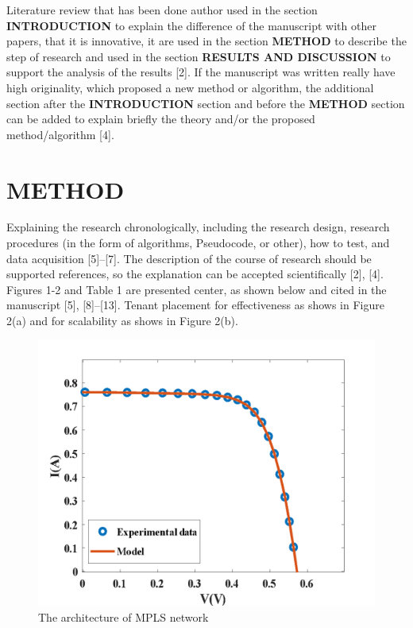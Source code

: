 \documentclass{iaesarticle}
\begin{document}
Literature review that has been done author used in the section \textbf{INTRODUCTION} to explain 
the difference of the manuscript with other papers, that it is innovative, it are used in the section \textbf{METHOD} to describe the step of research and used in the section \textbf{RESULTS AND DISCUSSION} to support the analysis of the results [2]. If the manuscript was written really have high originality, which proposed a new method or algorithm, the additional section after the \textbf{INTRODUCTION} section and before the \textbf{METHOD} section can be added to explain briefly the theory and/or the proposed method/algorithm [4].


\section{METHOD}
\label{}
Explaining the research chronologically, including the research design, research procedures (in the form of algorithms, Pseudocode, or other), how to test, and data acquisition [5]–[7]. The description of the course of research should be supported references, so the explanation can be accepted scientifically [2], [4]. Figures 1-2 and Table 1 are presented center, as shown below and cited in the manuscript [5], [8]–[13]. Tenant placement for effectiveness as shows in Figure 2(a) and for scalability as shows in Figure 2(b).

\begin{figure}[H]
\centering
\includegraphics[scale=0.26 ]{Figure1}
\vspace{.7em}
\caption{The architecture of MPLS network}
\end{figure}
\end{document}
